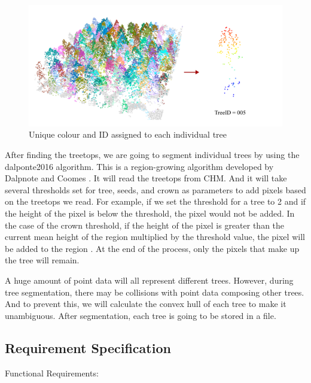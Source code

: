\documentclass[a4paper, 12pt]{article}
\begin{document}
\begin{figure}[H]
    \centering
    \includegraphics[scale=0.2]{Images/treeseg.png}
    \caption{Unique colour and ID assigned to each individual tree}
\end{figure}

After finding the treetops, we are going to segment individual trees by using the dalponte2016 algorithm. This is a region-growing algorithm developed by Dalpnote and Coomes \cite{9}. It will read the treetops from CHM. And it will take several thresholds set for tree, seeds, and crown as parameters to add pixels based on the treetops we read. For example, if we set the threshold for a tree to 2 and if the height of the pixel is below the threshold, the pixel would not be added. In the case of the crown threshold, if the height of the pixel is greater than the current mean height of the region multiplied by the threshold value, the pixel will be added to the region \cite{10}. At the end of the process, only the pixels that make up the tree will remain.

A huge amount of point data will all represent different trees. However, during tree segmentation, there may be collisions with point data composing other trees. And to prevent this, we will calculate the convex hull of each tree to make it unambiguous. After segmentation, each tree is going to be stored in a file.

\subsection{Requirement Specification}

Functional Requirements:
\end{document}
